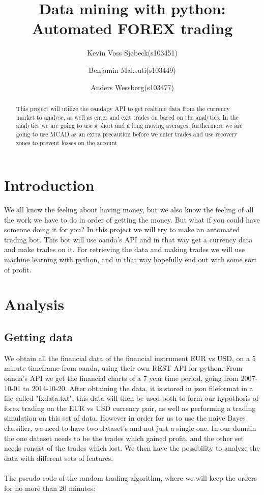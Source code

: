 \documentclass[10pt]{IEEEtran}
\title{Data mining with python: \\Automated FOREX trading}
\author{
	Kevin Voss Sjøbeck(s103451)\\
	\and
	Benjamin Maksuti(s103449)\\
	\and
	Anders Wessberg(s103477)
}
\begin{document}
\maketitle

\begin{abstract}
This project will utilize the oandapy API to get realtime data from the currency market to analyse, as well as enter and exit trades on based on the analytics. In the analytics we are going to use a short and a long moving averages, furthermore we are going to use MCAD as an extra precaution before we enter trades and use recovery zones to prevent losses on the account
\end{abstract}

\section{Introduction}
We all know the feeling about having money, but we also know the feeling of all the work we have to do in order of getting the money.
But what if you could have someone doing it for you? In this project we will try to make an automated trading bot. This bot will use oanda's API and in that way get a currency data and make trades on it.
For retrieving the data and making trades we will use machine learning with python, and in that way hopefully end out with some sort of profit.


\section{Analysis}

\subsection{Getting data}
We obtain all the financial data of the financial instrument EUR vs USD, on a 5 minute timeframe from oanda, using their own REST API for python. From oanda's API we get the financial charts of a 7 year time period, going from 2007-10-01 to 2014-10-20. After obtaining the data, it is stored in json fileformat in a file called "fxdata.txt", this data will then be used both to form our hypothosis of forex trading on the EUR vs USD currency pair, as well as performing a trading simulation on this set of data. However in order for us to use the naive Bayes classifier, we need to have two dataset's and not just a single one. In our domain the one dataset needs to be the trades which gained profit, and the other set needs consist of the trades which lost. We then have the possibility to analyze the data with different sets of features.\\
\\
The pseudo code of the random trading algorithm, where we will keep the orders for no more than 20 minutes:
\end{document}
